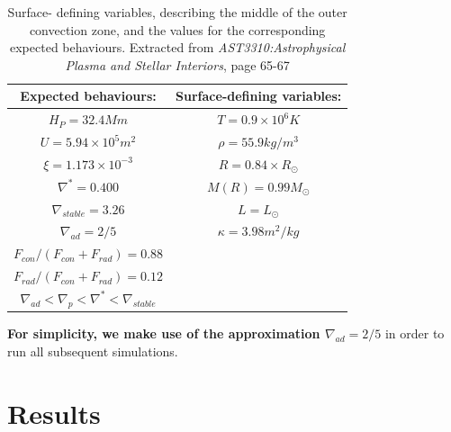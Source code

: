 \documentclass[10pt, nofootinbib, twocolumn]{revtex4-1}
\begin{document}
\begin{center}
\begin{table}[H]
\caption{Surface- defining variables, describing the middle of the outer convection zone, and the values for the corresponding expected behaviours. Extracted from \textit{AST3310:Astrophysical Plasma and Stellar Interiors}, page 65-67}
    \begin{tabular*}{0.5\textwidth}{@{\extracolsep{\fill}}cc}
    \toprule
    Expected behaviours: & Surface-defining variables:    \\
    \hline 
    $H_P = 32.4 Mm$ & $ T = 0.9\times10^6K$ \\
    $U=5.94 \times 10^5m^2 $ & $ \rho = 55.9 kg/m^3$\\
    $\xi = 1.173 \times 10^{-3}$ & $ R = 0.84\times R_\odot $ \\
    $\nabla^* = 0.400$ & $ M(R) = 0.99 M_\odot$ \\
    $\nabla_{stable} = 3.26$ & $ L =L_\odot $ \\
    $\nabla_{ad} = 2/5 $ & $ \kappa = 3.98 m^2/kg $\\
    $F_{con}/(F_{con}+F_{rad}) = 0.88 $ & \\
    $F_{rad}/(F_{con}+F_{rad}) = 0.12 $ & \\
    $\nabla_{ad}< \nabla_{p} <\nabla^* < \nabla_{stable}$
    \end{tabular*}
    \label{tab:second}
\end{table}
\end{center}

\textbf{For simplicity, we make use of the approximation $\nabla_{ad}=2/5$} in order to run all subsequent simulations. 



\section{Results}\label{sec:results}
\end{document}
